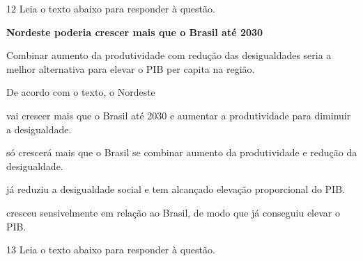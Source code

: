 \num{12} Leia o texto abaixo para responder à questão. 

\begin{myquote}

\textbf{Nordeste poderia crescer mais que o Brasil até 2030}

Combinar aumento da produtividade com redução das desigualdades seria a
melhor alternativa para elevar o PIB per capita na região.


\end{myquote}

De acordo com o texto, o Nordeste

\begin{escolha}
    
    \item vai crescer mais que o Brasil até 2030 e aumentar a produtividade para diminuir a desigualdade.
    
    \item só crescerá mais que o Brasil se combinar aumento da produtividade e redução da desigualdade. 
    
    \item já reduziu a desigualdade social e tem alcançado elevação proporcional do PIB.
    
    \item cresceu sensivelmente em relação ao Brasil, de modo que já conseguiu elevar o PIB.

\end{escolha}

\pagebreak

\num{13} Leia o texto abaixo para responder à questão. 

